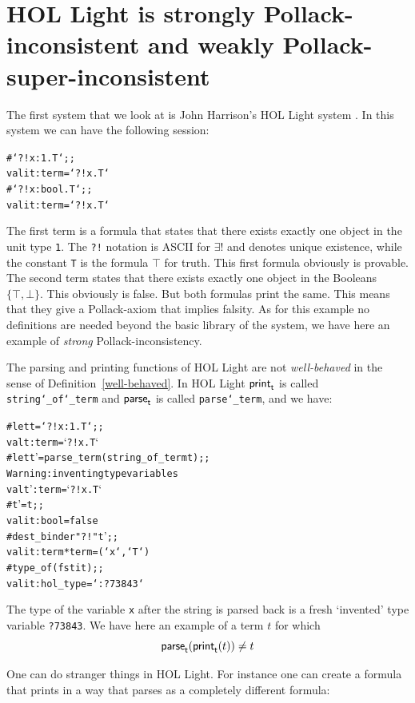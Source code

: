 \documentclass{entcs}
\begin{document}
\section{{\normalsize HOL} Light is strongly Pollack-inconsistent and weakly
Pollack-super-inconsistent}
\label{HOL_Light}

The first system that we look at is John Harrison's {\small HOL} Light
system \cite{har:xx,har:00,har:07:1}.
In this system we can have the following session:

\begin{alltt}
# `?!x:1. T`;;
val it : term = `?!x. T`
# `?!x:bool. T`;;
val it : term = `?!x. T`
\end{alltt}

\noindent
The first term is a formula that states that there exists exactly one object in the
unit type \texttt{1}.
The \texttt{?!} notation is {\small ASCII} for $\exists!$ and denotes
unique existence, while the constant \texttt{T} is the formula $\top$ for truth.
This first formula obviously is provable.
The second term states that there exists exactly one object in the
Booleans $\{\top,\bot\}$.
This obviously is false.
But both formulas print the same.
This means that they give a Pollack-axiom that implies falsity.
As for this example no definitions are needed beyond the basic library of the system,
we have here an example of \emph{strong} Pollack-inconsistency.

The parsing and printing functions of {\small HOL} Light
are not \emph{well-behaved} in the sense of Definition~\ref{well-behaved}.
In {\small HOL} Light
${\sf print}_{\sf t}$ is called \texttt{string\char`\_of\char`\_term}
and
${\sf parse}_{\sf t}$ is called \texttt{parse\char`\_term}, and we have:
\begin{alltt}
# let t = `?!x:1. T`;;
val t : term = `?!x. T`
# let t' = parse_term (string_of_term t);;
Warning: inventing type variables
val t' : term = `?!x. T`
# t' = t;;
val it : bool = false
# dest_binder "?!" t';;
val it : term * term = (`x`, `T`)
# type_of (fst it);;
val it : hol_type = `:?73843`
\end{alltt}
The type of the variable \texttt{x} after the string is parsed
back is a fresh `invented' type variable \texttt{?73843}.
We have here an example of a term $t$ for which
$${\sf parse}_{\sf t}({\sf print}_{\sf t}(t)) \ne t$$

\noindent
One can do stranger things in {\small HOL} Light.
For instance one can create a formula that prints in a way that parses
as a completely different formula:
\end{document}
